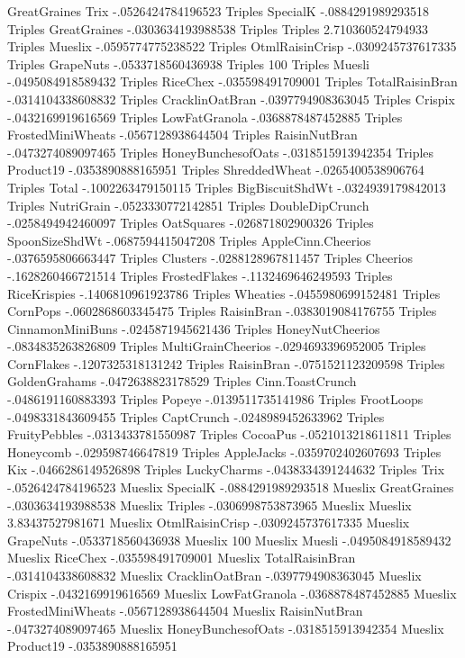 GreatGraines	Trix	-.0526424784196523
Triples	SpecialK	-.0884291989293518
Triples	GreatGraines	-.0303634193988538
Triples	Triples	2.710360524794933
Triples	Mueslix	-.0595774775238522
Triples	OtmlRaisinCrisp	-.0309245737617335
Triples	GrapeNuts	-.0533718560436938
Triples	100%
Triples	Muesli	-.0495084918589432
Triples	RiceChex	-.035598491709001
Triples	TotalRaisinBran	-.0314104338608832
Triples	CracklinOatBran	-.0397794908363045
Triples	Crispix	-.0432169919616569
Triples	LowFatGranola	-.0368878487452885
Triples	FrostedMiniWheats	-.0567128938644504
Triples	RaisinNutBran	-.0473274089097465
Triples	HoneyBunchesofOats	-.0318515913942354
Triples	Product19	-.0353890888165951
Triples	ShreddedWheat	-.0265400538906764
Triples	Total	-.1002263479150115
Triples	BigBiscuitShdWt	-.0324939179842013
Triples	NutriGrain	-.0523330772142851
Triples	DoubleDipCrunch	-.0258494942460097
Triples	OatSquares	-.026871802900326
Triples	SpoonSizeShdWt	-.0687594415047208
Triples	AppleCinn.Cheerios	-.0376595806663447
Triples	Clusters	-.0288128967811457
Triples	Cheerios	-.1628260466721514
Triples	FrostedFlakes	-.1132469646249593
Triples	RiceKrispies	-.1406810961923786
Triples	Wheaties	-.0455980699152481
Triples	CornPops	-.0602868603345475
Triples	RaisinBran	-.0383019084176755
Triples	CinnamonMiniBuns	-.0245871945621436
Triples	HoneyNutCheerios	-.0834835263826809
Triples	MultiGrainCheerios	-.0294693396952005
Triples	CornFlakes	-.1207325318131242
Triples	RaisinBran	-.0751521123209598
Triples	GoldenGrahams	-.0472638823178529
Triples	Cinn.ToastCrunch	-.0486191160883393
Triples	Popeye	-.0139511735141986
Triples	FrootLoops	-.0498331843609455
Triples	CaptCrunch	-.0248989452633962
Triples	FruityPebbles	-.0313433781550987
Triples	CocoaPus	-.0521013218611811
Triples	Honeycomb	-.029598746647819
Triples	AppleJacks	-.0359702402607693
Triples	Kix	-.0466286149526898
Triples	LuckyCharms	-.0438334391244632
Triples	Trix	-.0526424784196523
Mueslix	SpecialK	-.0884291989293518
Mueslix	GreatGraines	-.0303634193988538
Mueslix	Triples	-.0306998753873965
Mueslix	Mueslix	3.83437527981671
Mueslix	OtmlRaisinCrisp	-.0309245737617335
Mueslix	GrapeNuts	-.0533718560436938
Mueslix	100%
Mueslix	Muesli	-.0495084918589432
Mueslix	RiceChex	-.035598491709001
Mueslix	TotalRaisinBran	-.0314104338608832
Mueslix	CracklinOatBran	-.0397794908363045
Mueslix	Crispix	-.0432169919616569
Mueslix	LowFatGranola	-.0368878487452885
Mueslix	FrostedMiniWheats	-.0567128938644504
Mueslix	RaisinNutBran	-.0473274089097465
Mueslix	HoneyBunchesofOats	-.0318515913942354
Mueslix	Product19	-.0353890888165951

